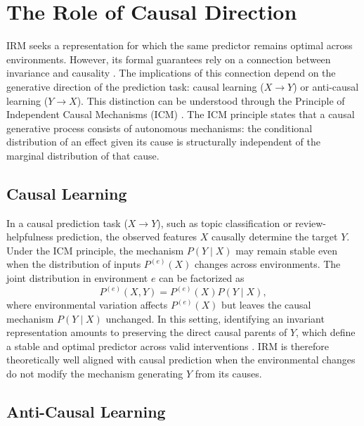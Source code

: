 \documentclass[11pt]{article}
\theoremstyle{definition}
\theoremstyle{plain}
\begin{document}
\section{The Role of Causal Direction}
\label{app:causal-direction}

IRM seeks a representation for which the same predictor remains optimal across environments. However, its formal guarantees rely on a connection between invariance and causality \citep{arjovsky2020outof, arjovsky2019invariant}. The implications of this connection depend on the generative direction of the prediction task: causal learning ($X\rightarrow Y$) or anti-causal learning ($Y\rightarrow X$). This distinction can be understood through the Principle of Independent Causal Mechanisms (ICM) \citep{scholkopf2012causal, peters2017elements}. The ICM principle states that a causal generative process consists of autonomous mechanisms: the conditional distribution of an effect given its cause is structurally independent of the marginal distribution of that cause.


\subsection{Causal Learning}

In a causal prediction task ($X\rightarrow Y$), such as topic classification or review-helpfulness prediction, the observed features $X$ causally determine the target $Y$. Under the ICM principle, the mechanism $P(Y\mid X)$ may remain stable even when the distribution of inputs $P^{(e)}(X)$ changes across environments. The joint distribution in environment $e$ can be factorized as
\begin{equation}
P^{(e)}(X,Y) = P^{(e)}(X)P(Y\mid X),
\label{eq:causal-factorization}
\end{equation}
where environmental variation affects $P^{(e)}(X)$ but leaves the causal mechanism $P(Y\mid X)$ unchanged. In this setting, identifying an invariant representation amounts to preserving the direct causal parents of $Y$, which define a stable and optimal predictor across valid interventions \citep{arjovsky2020outof, arjovsky2019invariant}. IRM is therefore theoretically well aligned with causal prediction when the environmental changes do not modify the mechanism generating $Y$ from its causes.


\subsection{Anti-Causal Learning}
\end{document}
